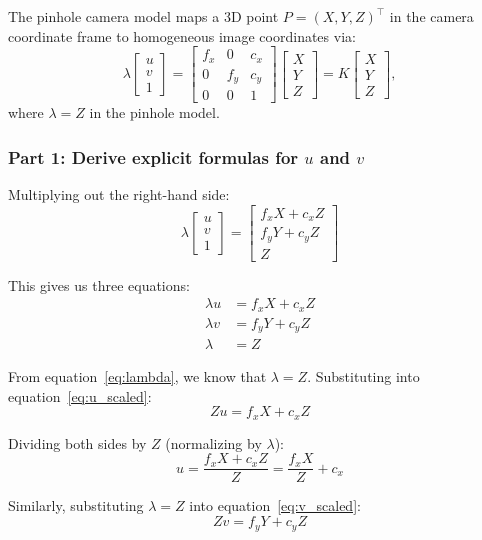 \documentclass[11pt]{article}
\begin{document}
The pinhole camera model maps a 3D point $P = (X, Y, Z)^\top$ in the camera coordinate frame to homogeneous image coordinates via:
\[
\lambda \begin{bmatrix} u \\ v \\ 1 \end{bmatrix} = \begin{bmatrix} f_x & 0 & c_x \\ 0 & f_y & c_y \\ 0 & 0 & 1 \end{bmatrix} \begin{bmatrix} X \\ Y \\ Z \end{bmatrix} = K \begin{bmatrix} X \\ Y \\ Z \end{bmatrix},
\]
where $\lambda = Z$ in the pinhole model.

\subsubsection*{Part 1: Derive explicit formulas for $u$ and $v$}

Multiplying out the right-hand side:
\[
\lambda \begin{bmatrix} u \\ v \\ 1 \end{bmatrix} = \begin{bmatrix} f_x X + c_x Z \\ f_y Y + c_y Z \\ Z \end{bmatrix}
\]

This gives us three equations:
\begin{align}
\lambda u &= f_x X + c_x Z \label{eq:u_scaled} \\
\lambda v &= f_y Y + c_y Z \label{eq:v_scaled} \\
\lambda &= Z \label{eq:lambda}
\end{align}

From equation~\eqref{eq:lambda}, we know that $\lambda = Z$. Substituting into equation~\eqref{eq:u_scaled}:
\[
Z u = f_x X + c_x Z
\]

Dividing both sides by $Z$ (normalizing by $\lambda$):
\[
u = \frac{f_x X + c_x Z}{Z} = \frac{f_x X}{Z} + c_x
\]

Similarly, substituting $\lambda = Z$ into equation~\eqref{eq:v_scaled}:
\[
Z v = f_y Y + c_y Z
\]
\end{document}
